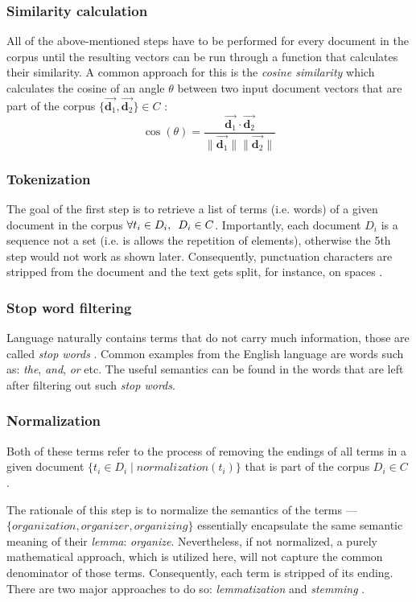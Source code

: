 \documentclass[12pt,a4paper]{report}
\begin{document}
\subsubsection{Similarity calculation}
All of the above-mentioned steps have to be performed for every document
in the corpus until the resulting vectors can be run through a function that
calculates their similarity. A common approach for this is the
\textit{cosine similarity} which calculates the cosine of an angle \(\theta\)
between two input document vectors that are part of the corpus
\(\{\vec{\mathbf d_1}, \vec{\mathbf d_2}\} \in C\) \cite{singhal2001ir}:
\[
  \cos(\theta) = \frac{
    \vec{\mathbf d_1} \cdot \vec{\mathbf d_2}
  }{
    \|\vec{\mathbf d_1} \|\|\vec{\mathbf d_2} \|
  }
\]


\subsubsection{Tokenization}
The goal of the first step is to retrieve a list of terms (i.e. words)
of a given document in the corpus \(\forall t_i \in D_i, \enskip D_i \in C\).
Importantly, each document \(D_i\) is a sequence not a set
(i.e. is allows the repetition of elements), otherwise the 5th step would not
work as shown later.
Consequently, punctuation characters are stripped from the document and
the text gets split, for instance, on spaces \cite{singhal2001ir}.


\subsubsection{Stop word filtering}
Language naturally contains terms that do not carry much information,
those are called \textit{stop words} \cite{singhal2001ir}.
Common examples from the English language are words such as:
\textit{the}, \textit{and}, \textit{or} etc.
The useful semantics can be found in the words that are left after filtering
out such \textit{stop words}.


\subsubsection{Normalization}
Both of these terms refer to the process of removing the endings of all terms
in a given document \(\{t_i \in D_i \mid normalization(t_i)\}\) that is part of
the corpus \(D_i \in C\) \cite{singhal2001ir}.

The rationale of this step is to normalize the semantics of the terms ---\\
\(\{\textit{organization}, \textit{organizer}, \textit{organizing}\}\) essentially
encapsulate the same semantic meaning of their \textit{lemma}: \textit{organize}.
Nevertheless, if not normalized, a purely mathematical approach,
which is utilized here, will not capture the common denominator of those terms.
Consequently, each term is stripped of its ending. There are two major approaches
to do so: \textit{lemmatization} and \textit{stemming} \cite{plisson2004lemma}.
\end{document}
